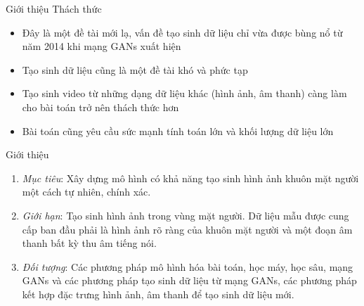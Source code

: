 \begin{frame}{Giới thiệu}
Thách thức
\begin{itemize}
    \item Đây là một đề tài mới lạ, vấn đề tạo sinh dữ liệu chỉ vừa được bùng nổ từ năm 2014 khi mạng GANs xuất hiện
    \item Tạo sinh dữ liệu cũng là một đề tài khó và phức tạp
    \item Tạo sinh video từ những dạng dữ liệu khác (hình ảnh, âm thanh) càng làm cho bài toán trở nên thách thức hơn
    \item Bài toán cũng yêu cầu sức mạnh tính toán lớn và khối lượng dữ liệu lớn
\end{itemize}
\end{frame}

\begin{frame}{Giới thiệu}
\begin{enumerate}
    \item \textit{Mục tiêu}: Xây dựng mô hình có khả năng tạo sinh hình ảnh khuôn mặt người một cách tự nhiên, chính xác.
    \item \textit{Giới hạn}: Tạo sinh hình ảnh trong vùng mặt người. Dữ liệu mẫu được cung cấp ban đầu phải là hình ảnh rõ ràng của khuôn mặt người và một đoạn âm thanh bất kỳ thu âm tiếng nói.
    \item \textit{Đối tượng}: Các phương pháp mô hình hóa bài toán, học máy, học sâu, mạng GANs và các phương pháp tạo sinh dữ liệu từ mạng GANs, các phương pháp kết hợp đặc trưng hình ảnh, âm thanh để tạo sinh dữ liệu mới.
\end{enumerate}
\end{frame}
